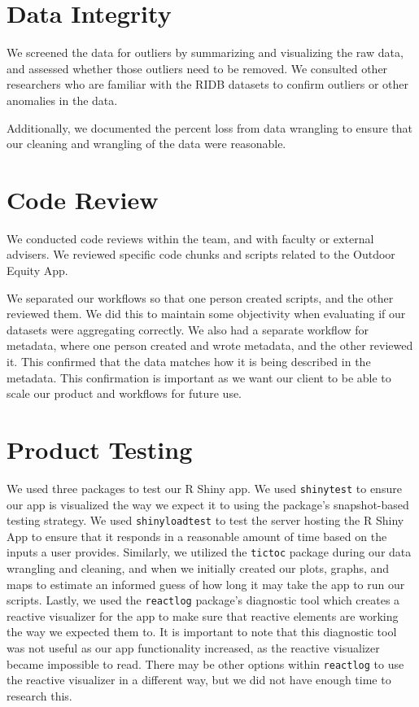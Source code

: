 \documentclass[
  11 pt,
  openany]{book}
\begin{document}
\hypertarget{data-integrity}{%
\section{Data Integrity}\label{data-integrity}}

We screened the data for outliers by summarizing and visualizing the raw data, and assessed whether those outliers need to be removed. We consulted other researchers who are familiar with the RIDB datasets to confirm outliers or other anomalies in the data.

Additionally, we documented the percent loss from data wrangling to ensure that our cleaning and wrangling of the data were reasonable.

\hypertarget{code-review}{%
\section{Code Review}\label{code-review}}

We conducted code reviews within the team, and with faculty or external advisers. We reviewed specific code chunks and scripts related to the Outdoor Equity App.

We separated our workflows so that one person created scripts, and the other reviewed them. We did this to maintain some objectivity when evaluating if our datasets were aggregating correctly. We also had a separate workflow for metadata, where one person created and wrote metadata, and the other reviewed it. This confirmed that the data matches how it is being described in the metadata. This confirmation is important as we want our client to be able to scale our product and workflows for future use.

\hypertarget{product-testing}{%
\section{Product Testing}\label{product-testing}}

We used three packages to test our R Shiny app. We used \texttt{shinytest} \citep{R-shinytest} to ensure our app is visualized the way we expect it to using the package's snapshot-based testing strategy. We used \texttt{shinyloadtest} \citep{R-shinyloadtest} to test the server hosting the R Shiny App to ensure that it responds in a reasonable amount of time based on the inputs a user provides. Similarly, we utilized the \texttt{tictoc} \citep{R-tictoc} package during our data wrangling and cleaning, and when we initially created our plots, graphs, and maps to estimate an informed guess of how long it may take the app to run our scripts. Lastly, we used the \texttt{reactlog} \citep{R-reactlog} package's diagnostic tool which creates a reactive visualizer for the app to make sure that reactive elements are working the way we expected them to. It is important to note that this diagnostic tool was not useful as our app functionality increased, as the reactive visualizer became impossible to read. There may be other options within \texttt{reactlog} to use the reactive visualizer in a different way, but we did not have enough time to research this.
\end{document}

